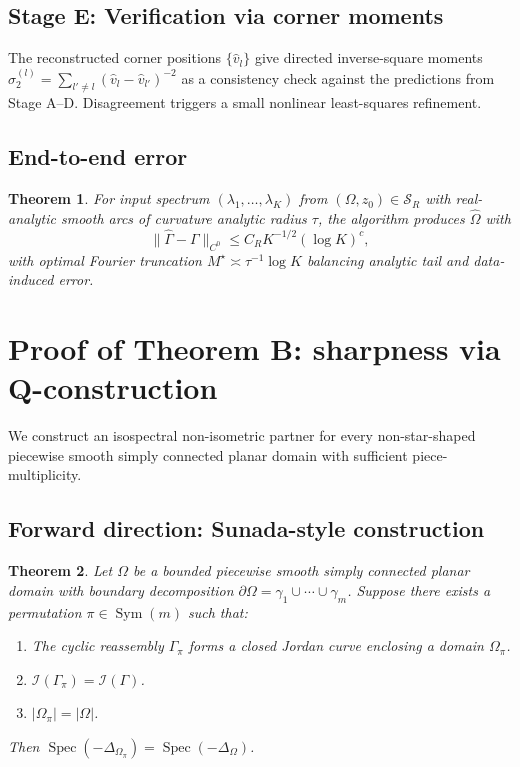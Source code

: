 \documentclass[11pt,reqno]{amsart}
\theoremstyle{plain}
\newtheorem{theorem}{Theorem}[section]
\theoremstyle{definition}
\theoremstyle{remark}
\DeclareMathOperator{\Spec}{Spec}
\DeclareMathOperator{\Sym}{Sym}
\newcommand{\Scal}{\mathcal{S}}
\newcommand{\Icalbb}{\mathcal{I}}
\begin{document}
\subsection{Stage E: Verification via corner moments}\label{sec:stage-E}

The reconstructed corner positions $\{\widehat v_l\}$ give directed inverse-square moments $\sigma_2^{(l)} = \sum_{l'\neq l}(\widehat v_l - \widehat v_{l'})^{-2}$ as a consistency check against the predictions from Stage A--D. Disagreement triggers a small nonlinear least-squares refinement.

\subsection{End-to-end error}\label{ss:end-to-end-master}

\begin{theorem}\label{thm:end-to-end}
For input spectrum $(\lambda_1, \dots, \lambda_K)$ from $(\Omega, z_0) \in \Scal_R$ with real-analytic smooth arcs of curvature analytic radius $\tau$, the algorithm produces $\widehat\Omega$ with
\[
\|\widehat\Gamma - \Gamma\|_{C^0} \leq C_R K^{-1/2}(\log K)^c,
\]
with optimal Fourier truncation $M^\star \asymp \tau^{-1}\log K$ balancing analytic tail and data-induced error.
\end{theorem}

\section{Proof of Theorem B: sharpness via Q-construction}\label{sec:sharpness}

We construct an isospectral non-isometric partner for every non-star-shaped piecewise smooth simply connected planar domain with sufficient piece-multiplicity.

\subsection{Forward direction: Sunada-style construction}\label{ss:forward-master}

\begin{theorem}\label{thm:forward-master}
Let $\Omega$ be a bounded piecewise smooth simply connected planar domain with boundary decomposition $\partial\Omega = \gamma_1 \cup \cdots \cup \gamma_m$. Suppose there exists a permutation $\pi \in \Sym(m)$ such that:
\begin{enumerate}
\item[\rm(a)] The cyclic reassembly $\Gamma_\pi$ forms a closed Jordan curve enclosing a domain $\Omega_\pi$.
\item[\rm(b)] $\Icalbb(\Gamma_\pi) = \Icalbb(\Gamma)$.
\item[\rm(c)] $|\Omega_\pi| = |\Omega|$.
\end{enumerate}
Then $\Spec(-\Delta_{\Omega_\pi}) = \Spec(-\Delta_\Omega)$.
\end{theorem}
\end{document}
